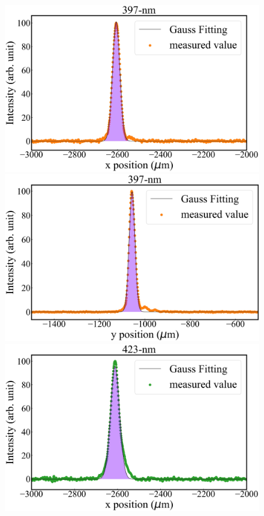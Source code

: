 \begin{figure}[h]
\begin{center}
\begin{minipage}{0.48\linewidth}
\begin{center}
		\includegraphics[width = 0.98\columnwidth]{./experimental_setup/figure/397GaussianFittingXpos.jpg}
	\end{center}
	\end{minipage}
	\begin{minipage}{0.48\linewidth}
	\begin{center}
		\includegraphics[width=0.98\columnwidth]{./experimental_setup/figure/397GaussianFittingYpos.jpg}
	\end{center}
	\end{minipage}
	\begin{minipage}{0.48\linewidth}
	\begin{center}
		\includegraphics[width = 0.98\columnwidth]{./experimental_setup/figure/423GaussianFittingXpos.jpg}

\end{center}
\end{minipage}
\end{center}
\end{figure}
